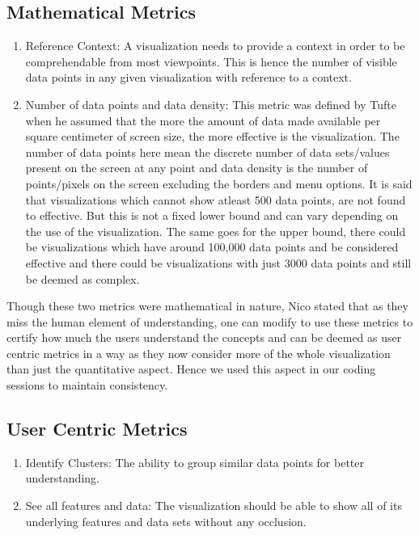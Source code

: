 \documentclass[seploa]{beavtex}
\begin{document}
\subsection{Mathematical Metrics}

\begin{enumerate}
\item Reference Context: A visualization needs to provide a context in order to be comprehendable from most viewpoints. This is hence the number of visible data points in any given visualization with reference to a context\cite{brath1997}.

\item Number of data points and data density: This metric was defined by Tufte when he assumed that the more the amount of data made available per square centimeter of screen size, the more effective is the visualization. The number of data points here mean the discrete number of data sets/values present on the screen at any point and data density is the number of points/pixels on the screen excluding the borders and menu options. It is said that visualizations which cannot show atleast 500 data points, are not found to effective\cite{brath1997}. But this is not a fixed lower bound and can vary depending on the use of the visualization. The same goes for the upper bound, there could be visualizations which have around 100,000 data points and be considered effective and there could be visualizations with just 3000 data points and still be deemed as complex\cite{brath1997}.
\end{enumerate}

Though these two metrics were mathematical in nature, Nico stated that as they miss the human element of understanding, one can modify to use these metrics to certify how much the users understand the concepts and can be deemed as user centric metrics in a way as they now consider more of the whole visualization than just the quantitative aspect\cite{nico2007}. Hence we used this aspect in our coding sessions to maintain consistency.

\subsection{User Centric Metrics}

\begin{enumerate}
\item Identify Clusters: The ability to group similar data points for better understanding\cite{grins2001}.

\item See all features and data: The visualization should be able to show all of its underlying features and data sets without any occlusion\cite{grins2001}.
\end{enumerate}
\end{document}
